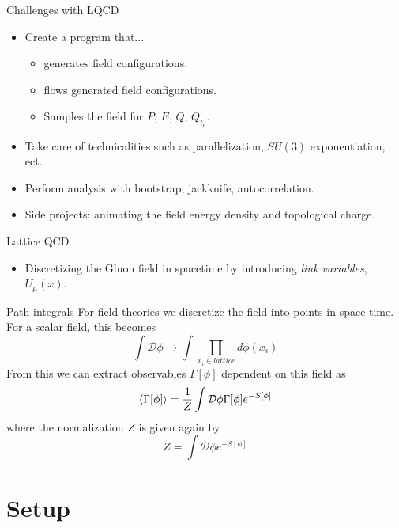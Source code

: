 \documentclass[10pt]{beamer}
\newcommand{\D}{\mathcal{D}}
\begin{document}
\begin{frame}{Challenges with LQCD}
	\begin{itemize}%
		\item Create a program that...
		\begin{itemize}%
			\item generates field configurations.
			\item flows generated field configurations.
			\item Samples the field for $P$, $E$, $Q$, $Q_{t_e}$.
		\end{itemize}
		\item Take care of technicalities such as parallelization, $SU(3)$ exponentiation, ect.
		\item Perform analysis with bootstrap, jackknife, autocorrelation.
		\item Side projects: animating the field energy density and topological charge.
	\end{itemize}
\end{frame}


\begin{frame}{Lattice QCD}
	\begin{itemize}%
		\item Discretizing the Gluon field in spacetime by introducing \textit{link variables}, $U_\mu(x)$.

	\end{itemize}
\end{frame}

\begin{frame}{Path integrals}
	For field theories we discretize the field into points in space time. For a scalar field, this becomes 
	\[
		 \int \D \phi \rightarrow \int \prod_{x_i \in lattice} d\phi(x_i)
	\]
	From this we can extract observables $\Gamma[\phi]$ dependent on this field as
	\[
		\braket{\Gamma[\phi]} = \frac{1}{Z} \int \D \phi \Gamma[\phi] e^{-S[\phi]}
	\]
	where the normalization $Z$ is given again by 
	\[
		Z = \int \D \phi e^{-S[\phi]}
	\]
\end{frame}

\section{Setup}
\end{document}

